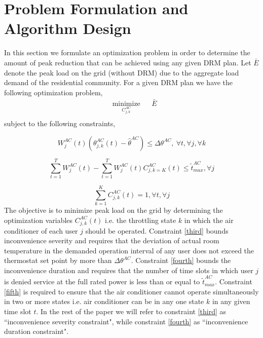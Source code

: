 \documentclass[10pt,twocolumn,twoside]{IEEEtran}
\begin{document}
\section{Problem Formulation and Algorithm Design}
In this section we formulate an optimization problem in order to determine the amount of peak reduction that can be achieved using any given DRM plan. Let $\bar{E}$ denote the peak load on the grid (without DRM) due to the aggregate load demand of the residential community. For a given DRM plan we have the following optimization problem,
\begin{equation}
\begin{aligned}
& \underset{C^{AC}_{j,k} }{\text{minimize}}
& & \bar{E} \\
\end{aligned}
\end{equation}
subject to the following constraints,
\begin{center}
\begin{equation}
W^{AC}_{j}(t) \left( \theta^{AC}_{j,k}(t) - \hat{\theta}^{AC}\right) \leq \Delta{\theta^{AC}}, \: \forall t, \forall j, \forall k
\label{third}
\end{equation}
\end{center}
\begin{center}
\begin{equation}
\sum_{t=1}^{T} W^{AC}_{j}(t)- \sum_{t=1}^{T} W^{AC}_{j}(t)C^{AC}_{j,k=K}(t) \leq \tilde{t}^{AC}_{max}, \forall j
\label {fourth}
\end{equation}
\end{center}
\begin{equation}
\sum_{k=1}^{K} C^{AC}_{j,k}(t)=1, \forall t, \forall j
\label{fifth}
\end{equation}
The objective is to minimize peak load on the grid by determining the optimization variables $C^{AC}_{j,k}(t)$ i.e. the throttling state $k$ in which the air conditioner of each user $j$ should be operated. Constraint \eqref{third} bounds inconvenience severity and requires that the deviation of actual room temperature in the demanded operation interval of any user does not exceed the thermostat set point by more than $\Delta{\theta^{AC}}$. Constraint \eqref{fourth} bounds the inconvenience duration and requires that the number of time slots in which user $j$ is denied service at the full rated power is less than or equal to $\tilde{t}^{AC}_{max}$. Constraint \eqref{fifth} is required to ensure that the air conditioner cannot operate simultaneously in two or more states i.e. air conditioner can be in any one state $k$ in any given time slot $t$. In the rest of the paper we will refer to constraint \eqref{third} as ``inconvenience severity constraint", while constraint \eqref{fourth} as ``inconvenience duration constraint".
\end{document}
